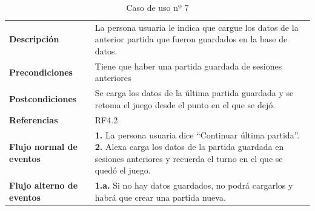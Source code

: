 \begin{table}[H]
	\centering
	\begin{tabular}{|p{3cm}|p{12cm}|}
		\hline
		\rowcolor{lightgray}
		\multicolumn{2}{|c|}{\textbf{CU07}: Continuar la partida} \\
		\hline
		\textbf{Descripción} & La persona usuaria le indica que cargue los datos de la anterior partida que fueron guardados en la base de datos. \vspace{0.2cm} \\
		\hline
		\textbf{Precondiciones} & Tiene que haber una partida guardada de sesiones anteriores \vspace{0.2cm} \\
		\hline
		\textbf{Postcondiciones} & Se carga los datos de la última partida guardada y se retoma el juego desde el punto en el que se dejó. \vspace{0.2cm} \\
		\hline
		\textbf{Referencias} & RF4.2 \vspace{0.2cm} \\
		\hline
		\textbf{Flujo normal de eventos} &
		\textbf{1.} La persona usuaria dice \enquote{Continuar última partida}. \newline
		\vspace{0.2cm}
		\textbf{2.} Alexa carga los datos de la partida guardada en sesiones anteriores y recuerda el turno en el que se quedó el juego.
		\vspace{0.2cm}\\
		\hline
		\textbf{Flujo alterno de eventos} &
		\textbf{1.a.} Si no hay datos guardados, no podrá cargarlos y habrá que crear una partida nueva. \vspace{0.2cm} \\
		\hline
	\end{tabular}
	\caption{Caso de uso nº 7}
	\label{tab:CU07}
\end{table}


